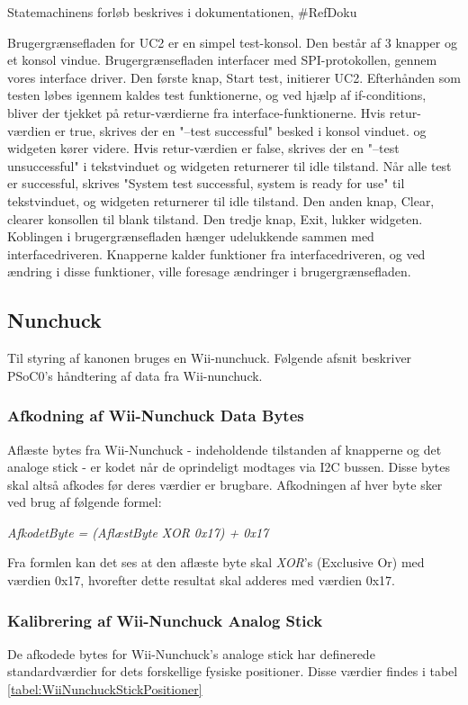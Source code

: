 Statemachinens forløb beskrives i dokumentationen, \#RefDoku

Brugergrænsefladen for UC2 er en simpel test-konsol. Den består af 3 knapper og et konsol vindue. Brugergrænsefladen interfacer med SPI-protokollen, gennem vores interface driver. Den første knap, Start test, initierer UC2. Efterhånden som testen løbes igennem kaldes test funktionerne, og ved hjælp af if-conditions, bliver der tjekket på retur-værdierne fra interface-funktionerne. Hvis retur-værdien er true, skrives der en "--test successful" besked i konsol vinduet. og widgeten kører videre. Hvis retur-værdien er false, skrives der en "--test unsuccessful" i tekstvinduet og widgeten returnerer til idle tilstand. Når alle test er successful, skrives "System test successful, system is ready for use" til tekstvinduet, og widgeten returnerer til idle tilstand. Den anden knap, Clear, clearer konsollen til blank tilstand. Den tredje knap, Exit, lukker widgeten.
Koblingen i brugergrænsefladen hænger udelukkende sammen med interfacedriveren. Knapperne kalder funktioner fra interfacedriveren, og ved ændring i disse funktioner, ville foresage ændringer i brugergrænsefladen.

\subsection{Nunchuck}
Til styring af kanonen bruges en Wii-nunchuck. Følgende afsnit beskriver PSoC0's håndtering af data fra Wii-nunchuck.

\subsubsection{Afkodning af Wii-Nunchuck Data Bytes}
Aflæste bytes fra Wii-Nunchuck - indeholdende tilstanden af knapperne og det analoge stick - er kodet når de oprindeligt modtages via I2C bussen. Disse bytes skal altså afkodes før deres værdier er brugbare. Afkodningen af hver byte sker ved brug af følgende formel:

\textit{AfkodetByte = (AflæstByte XOR 0x17) + 0x17}

Fra formlen kan det ses at den aflæste byte skal \textit{XOR}'s (Exclusive Or) med værdien 0x17, hvorefter dette resultat skal adderes med værdien 0x17.

\subsubsection{Kalibrering af Wii-Nunchuck Analog Stick}
De afkodede bytes for Wii-Nunchuck's analoge stick har definerede standardværdier for dets forskellige fysiske positioner. Disse værdier findes i tabel \ref{tabel:WiiNunchuckStickPositioner}

